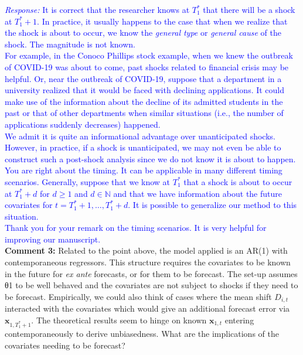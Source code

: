 \documentclass[12pt]{article}
\newcommand{\response}[1]{\noindent \textcolor{blue}{\emph{Response:} #1}}
\begin{document}
\response{It is correct that the researcher knows at $T_1^*$ that there will be a shock at $T_1^* + 1$. In practice, it usually happens to the case that when we realize that the shock is about to occur, we  know the \emph{general type}  or \emph{general cause} of the shock. The magnitude is not known. \\

For example, in the Conoco Phillips stock example, when we knew the outbreak of COVID-19 was about to come, past shocks related to financial crisis may be helpful. Or, near the outbreak of COVID-19, suppose that a department in a university realized that it would be faced with declining applications. It could make use of the information about the decline of its admitted students in the past or that of other departments when similar situations (i.e., the number of applications suddenly decreases) happened.\\

We admit it is quite an informational advantage over unanticipated shocks. However, in practice, if a shock is unanticipated, we may not even be able to construct such a post-shock analysis since we do not know it is about to happen.\\

You are right about the timing. It can be applicable in many different timing scenarios. Generally, suppose that we know at $T_1^*$ that a shock is about to occur at $T_1^* + d$ for $d\geq 1$ and $d\in \mathbb{N}$ and that we have information about the future covariates for $t = T_1^* +1 , \ldots, T_1^* + d$. It is possible to generalize our method to this situation. \\

Thank you for your remark on the timing scenarios. It is very helpful for improving our manuscript.} \\

{\bf Comment 3:} Related to the point above, the model applied is an AR(1) with contemporaneous regressors. This structure requires the covariates to be known in the future for \emph{ex ante} forecasts, or for them to be forecast. The set-up assumes θ1 to be well behaved and the covariates are not subject to shocks if they need to be forecast. Empirically, we could also think of cases where the mean shift $D_{i,t}$ interacted with the covariates which would give an additional forecast error via $\mathbf{x}_{1, T_1^* + 1}$. The theoretical results seem to hinge on known $\mathbf{x}_{1,t}$ entering contemporaneously to derive unbiasedness. What are the implications of the covariates needing to be forecast? \\
\end{document}
